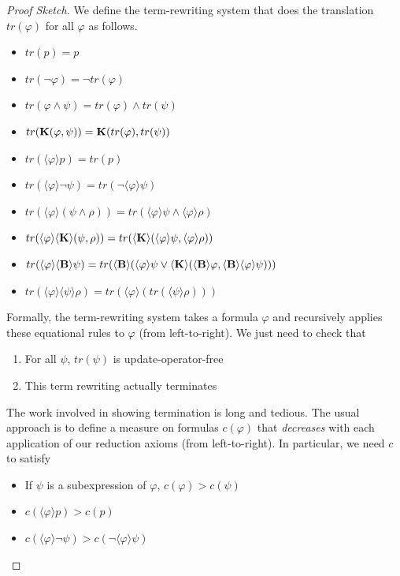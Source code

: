 \documentclass[letterpaper]{article}
\theoremstyle{definition}
\newenvironment{sketch}{\begin{proof}[Proof Sketch]}{\end{proof}}
\newcommand{\Know}[2]{\textrm{\textup{\textbf{K}}}(#1, #2)}
\newcommand{\diaBelieve}[1]{\langle \textrm{\textup{\textbf{B}}} \rangle #1}
\newcommand{\diaKnow}[2]{\langle \textrm{\textup{\textbf{K}}} \rangle(#1, #2)}
\newcommand{\diaHebbop}[1]{\langle #1\rangle}
\begin{document}
\begin{sketch}
    We define the term-rewriting system that does the translation $tr(\varphi)$ for all $\varphi$ as follows.
    \begin{itemize}
        \item $tr(p) = p$
        \item $tr(\neg \varphi) = \neg tr(\varphi)$
        \item $tr(\varphi \land \psi) = tr(\varphi) \land tr(\psi)$
        \item $tr(\Know{\varphi}{\psi}) = \Know{tr(\varphi)}{tr(\psi)}$
        \item $tr(\diaHebbop{\varphi} p) = tr(p)$
        \item $tr(\diaHebbop{\varphi} \neg \psi) = tr(\neg \diaHebbop{\varphi} \psi)$
        \item $tr(\diaHebbop{\varphi} (\psi \land \rho)) = tr(\diaHebbop{\varphi} \psi \land \diaHebbop{\varphi} \rho)$
        \item $tr(\diaHebbop{\varphi} \diaKnow{\psi}{\rho}) = tr(\diaKnow{\diaHebbop{\varphi} \psi}{\diaHebbop{\varphi} \rho})$
        \item $tr(\diaHebbop{\varphi} \diaBelieve{\psi}) = tr(\diaBelieve{(\diaHebbop{\varphi} \psi \lor \diaKnow{\diaBelieve{\varphi}}{\diaBelieve{\diaHebbop{\varphi} \psi})}})$
        \item $tr(\diaHebbop{\varphi} \diaHebbop{\psi} \rho) = tr(\diaHebbop{\varphi} (tr(\diaHebbop{\psi} \rho)))$
    \end{itemize}
    Formally, the term-rewriting system takes a formula $\varphi$ and recursively applies these equational rules to $\varphi$ (from left-to-right).  We just need to check that
    \begin{enumerate}
        \item For all $\psi$, $tr(\psi)$ is update-operator-free
        \item This term rewriting actually terminates
    \end{enumerate}
    The work involved in showing termination is long and tedious.  The usual approach is to define a measure on formulas $c(\varphi)$ that \emph{decreases} with each application of our reduction axioms (from left-to-right).  In particular, we need $c$ to satisfy
    \begin{itemize}
        \item If $\psi$ is a subexpression of $\varphi$, $c(\varphi) > c(\psi)$
        \item $c(\diaHebbop{\varphi} p) > c(p)$
        \item $c(\diaHebbop{\varphi} \neg \psi) > c(\neg \diaHebbop{\varphi} \psi)$

\end{itemize}
\end{sketch}
\end{document}
